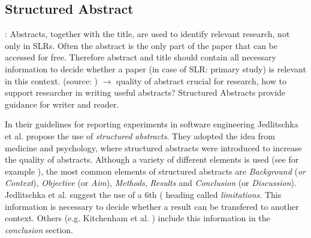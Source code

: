 \subsection{Structured Abstract}

: Abstracts, together with the title, are used to identify relevant research, not only in SLRs. Often the abstract is the only part of the paper that can be accessed for free. Therefore abstract and title should contain all necessary information to decide whether a paper (in case of SLR: primary study) is relevant in this context. (source: )
	$\rightarrow$ quality of abstract crucial for research, how to support researcher in writing useful abstracts? Structured Abstracts provide guidance for writer and reader. 
\newline

In their guidelines for reporting experiments in software engineering Jedlitschka et al. \cite{Jedlitschka2008} propose the use of \emph{structured abstracts}. They adopted the idea from medicine and psychology, where structured abstracts were introduced to increase the quality of abstracts. Although a variety of different elements is used (see for example ), the most common elements of structured abstracts are \emph{Background} (\emph{or Context}), \emph{Objective} (or \emph{Aim}), \emph{Methods}, \emph{Results} and \emph{Conclusion} (or \emph{Discussion}). Jedlitschka et al. \cite{Jedlitschka2008} suggest the use of a 6th ( heading called \emph{limitations}. This information is necessary to decide whether a result can be transfered to another context. Others  (e.g. Kitchenham et al. \cite{KBO2008}) include this information in the \emph{conclusion} section.

